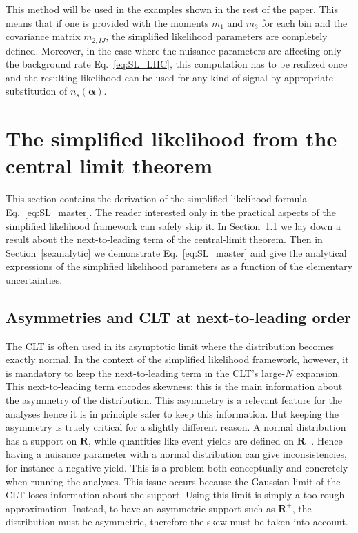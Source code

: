 \documentclass[11pt]{article}
\begin{document}
This method will be used in the examples shown in the rest of the paper. This means that if one is provided with the moments $m_{1}$ and $m_{3}$ for each bin and the covariance matrix $m_{2,IJ}$, the simplified likelihood parameters are completely defined. Moreover, in the case where the nuisance parameters are affecting only the background rate Eq.~\eqref{eq:SL_LHC}, this computation has to be realized once and the resulting likelihood can be used for any kind of signal by appropriate substitution of $n_{s}(\bm{\alpha})$.




\section{The simplified likelihood from the central limit theorem}
\label{se:SL_theory}

This section contains the derivation of the simplified likelihood formula Eq.~\eqref{eq:SL_master}.
The reader interested only in the practical aspects of the simplified likelihood framework can safely skip it. In Section~\ref{se:skew_CLT} we lay down a  result about the next-to-leading term of the central-limit theorem. Then in Section~\ref{se:analytic} we demonstrate Eq.~\eqref{eq:SL_master} and give the analytical expressions of the simplified likelihood parameters as a function of the elementary uncertainties.

\subsection{Asymmetries and CLT at next-to-leading order}
\label{se:skew_CLT}

The CLT is often used in its asymptotic limit where the distribution becomes exactly normal. In the context of the simplified likelihood framework, however, it is mandatory to keep the next-to-leading  term in the CLT's large-$N$ expansion. This next-to-leading term encodes skewness: this is the main information about the asymmetry of the distribution. This asymmetry is a relevant feature for the analyses hence it is in principle safer to keep this information. But keeping the asymmetry is truely critical for a slightly different reason. A normal distribution has a support on $\mathbf{R}$, while quantities like event yields are defined on $\mathbf{R}^+$. Hence having a nuisance parameter with a normal distribution can give inconsistencies, for instance a negative yield. This is a problem both conceptually and concretely when running the  analyses. This issue occurs because the  Gaussian limit of the CLT  loses information about the support. Using this limit is simply a too rough approximation.
  Instead, to have an asymmetric support such as $\mathbf{R}^+$,  the distribution must be asymmetric, therefore the skew must be taken into account.
\end{document}
